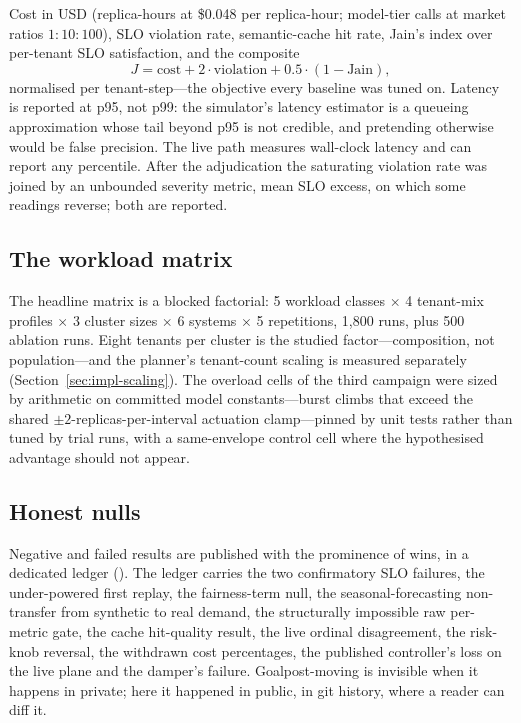 Cost in USD (replica-hours at \$0.048 per replica-hour; model-tier calls
at market ratios $1{:}10{:}100$), SLO violation rate, semantic-cache hit
rate, Jain's index over per-tenant SLO satisfaction, and the composite
\begin{equation}
\label{eq:J}
J = \mathrm{cost} + 2\cdot\mathrm{violation} + 0.5\cdot(1 - \mathrm{Jain}),
\end{equation}
normalised per tenant-step---the objective every baseline was tuned on.
Latency is reported at p95, not p99: the simulator's latency estimator is a
queueing approximation whose tail beyond p95 is not credible, and
pretending otherwise would be false precision. The live path measures
wall-clock latency and can report any percentile. After the adjudication
the saturating violation rate was joined by an unbounded severity metric,
mean SLO excess, on which some readings reverse; both are reported.

\subsection{The workload matrix}
\label{sec:method-matrix}

The headline matrix is a blocked factorial: 5 workload classes $\times$ 4
tenant-mix profiles $\times$ 3 cluster sizes $\times$ 6 systems $\times$ 5
repetitions, 1,800 runs, plus 500 ablation runs. Eight tenants per cluster
is the studied factor---composition, not population---and the planner's
tenant-count scaling is measured separately
(Section~\ref{sec:impl-scaling}). The overload cells of the third campaign
were sized by arithmetic on committed model constants---burst climbs that
exceed the shared $\pm 2$-replicas-per-interval actuation clamp---pinned
by unit tests rather than tuned by trial runs, with a same-envelope
control cell where the hypothesised advantage should not appear.

\subsection{Honest nulls}
\label{sec:method-nulls}

Negative and failed results are published with the prominence of wins, in
a dedicated ledger (). The
ledger carries the two confirmatory SLO failures, the under-powered first
replay, the fairness-term null, the seasonal-forecasting non-transfer from
synthetic to real demand, the structurally impossible raw per-metric gate,
the cache hit-quality result, the live ordinal disagreement, the risk-knob
reversal, the withdrawn cost percentages, the published controller's loss
on the live plane and the damper's failure. Goalpost-moving is invisible
when it happens in private; here it happened in public, in git history,
where a reader can diff it.
